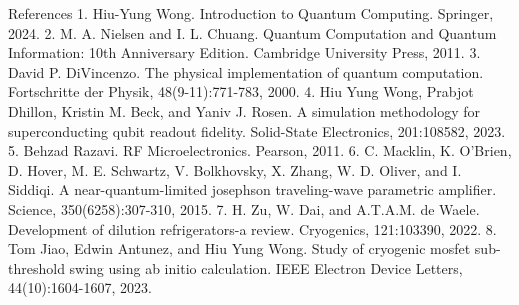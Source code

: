 \documentclass{article}
\begin{document}
References
1. Hiu-Yung Wong. Introduction to Quantum Computing. Springer, 2024.
2. M. A. Nielsen and I. L. Chuang. Quantum Computation and Quantum Information: 10th Anniversary Edition. Cambridge University Press, 2011.
3. David P. DiVincenzo. The physical implementation of quantum computation. Fortschritte der Physik, 48(9-11):771-783, 2000.
4. Hiu Yung Wong, Prabjot Dhillon, Kristin M. Beck, and Yaniv J. Rosen. A simulation methodology for superconducting qubit readout fidelity. Solid-State Electronics, 201:108582, 2023.
5. Behzad Razavi. RF Microelectronics. Pearson, 2011.
6. C. Macklin, K. O'Brien, D. Hover, M. E. Schwartz, V. Bolkhovsky, X. Zhang, W. D. Oliver, and I. Siddiqi. A near-quantum-limited josephson traveling-wave parametric amplifier. Science,
350(6258):307-310, 2015.
7. H. Zu, W. Dai, and A.T.A.M. de Waele. Development of dilution refrigerators-a review.
Cryogenics, 121:103390, 2022.
8. Tom Jiao, Edwin Antunez, and Hiu Yung Wong. Study of cryogenic mosfet sub-threshold swing using ab initio calculation. IEEE Electron Device Letters, 44(10):1604-1607, 2023.
\end{document}
